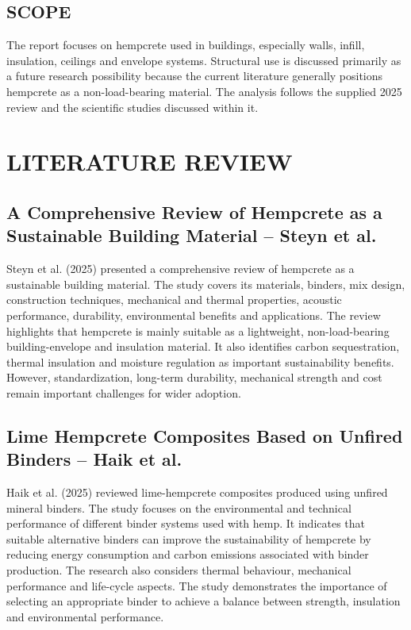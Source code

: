 \documentclass[12pt,a4paper,final]{report}
\begin{document}
\vspace{5.5pt}
\section[Scope]{SCOPE}
The report focuses on hempcrete used in buildings, especially walls, infill, insulation, ceilings
and envelope systems. Structural use is discussed primarily as a future research possibility
because the current literature generally positions hempcrete as a non-load-bearing material.
The analysis follows the supplied 2025 review and the scientific studies discussed within it.

\chapter{LITERATURE REVIEW}

\section*{A Comprehensive Review of Hempcrete as a Sustainable Building Material -- Steyn et al.}
Steyn et al. (2025) presented a comprehensive review of hempcrete as a sustainable building
material. The study covers its materials, binders, mix design, construction techniques,
mechanical and thermal properties, acoustic performance, durability, environmental benefits
and applications. The review highlights that hempcrete is mainly suitable as a lightweight,
non-load-bearing building-envelope and insulation material. It also identifies carbon
sequestration, thermal insulation and moisture regulation as important sustainability benefits.
However, standardization, long-term durability, mechanical strength and cost remain
important challenges for wider adoption.

\section*{Lime Hempcrete Composites Based on Unfired Binders -- Haik et al.}
Haik et al. (2025) reviewed lime-hempcrete composites produced using unfired mineral
binders. The study focuses on the environmental and technical performance of different binder
systems used with hemp. It indicates that suitable alternative binders can improve the
sustainability of hempcrete by reducing energy consumption and carbon emissions associated
with binder production. The research also considers thermal behaviour, mechanical
performance and life-cycle aspects. The study demonstrates the importance of selecting an
appropriate binder to achieve a balance between strength, insulation and environmental
performance.
\end{document}
